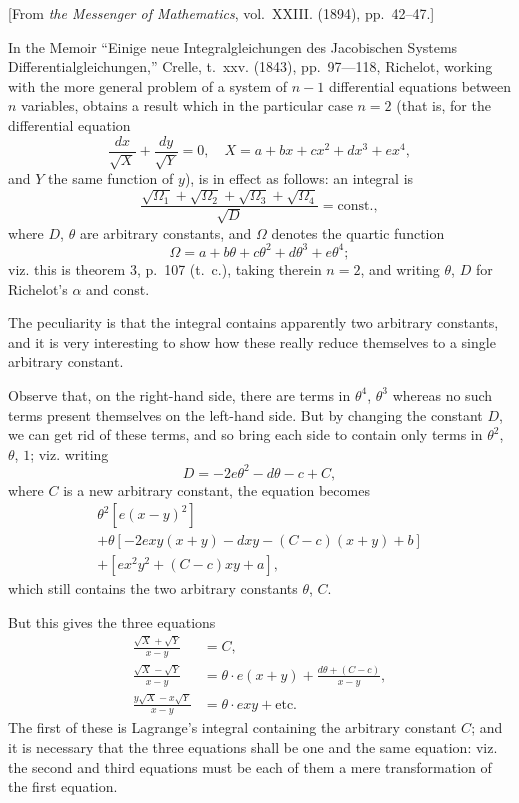 \documentclass[11pt,a4paper]{book}
\begin{document}
[From \textit{the Messenger of Mathematics}, vol.~XXIII. (1894), pp.~42--47.]
\bigskip

In the Memoir ``Einige neue Integralgleichungen des Jacobischen Systems Differentialgleichungen,'' Crelle, t.~xxv. (1843), pp.~97---118, Richelot, working with the more general problem of a system of $n-1$ differential equations between $n$ variables, obtains a result which in the particular case $n=2$ (that is, for the differential equation
\[
\frac{dx}{\sqrt{X}} + \frac{dy}{\sqrt{Y}} = 0, \quad X = a + bx + cx^2 + dx^3 + ex^4,
\]
and $Y$ the same function of $y$), is in effect as follows: an integral is
\[
\frac{\sqrt{\Omega_1}+\sqrt{\Omega_2}+\sqrt{\Omega_3}+\sqrt{\Omega_4}}{\sqrt{D}} = \text{const.},
\]
where $D$, $\theta$ are arbitrary constants, and $\Omega$ denotes the quartic function
\[
\Omega = a + b\theta + c\theta^2 + d\theta^3 + e\theta^4;
\]
viz. this is theorem 3, p.~107 (t.~c.), taking therein $n=2$, and writing $\theta$, $D$ for Richelot's $\alpha$ and const.

The peculiarity is that the integral contains apparently two arbitrary constants, and it is very interesting to show how these really reduce themselves to a single arbitrary constant.

Observe that, on the right-hand side, there are terms in $\theta^4$, $\theta^3$ whereas no such terms present themselves on the left-hand side. But by changing the constant $D$, we can get rid of these terms, and so bring each side to contain only terms in $\theta^2$, $\theta$, $1$; viz. writing
\[
D = -2e\theta^2 - d\theta - c + C,
\]
where $C$ is a new arbitrary constant, the equation becomes
\begin{multline*}
\theta^2\left[e(x-y)^2\right] \\
+ \theta\left[-2exy(x+y) - dxy - (C-c)(x+y) + b\right] \\
+ \left[ex^2y^2 + (C-c)xy + a\right],
\end{multline*}
which still contains the two arbitrary constants $\theta$, $C$.

But this gives the three equations
\begin{align*}
\frac{\sqrt{X}+\sqrt{Y}}{x-y} &= C, \\
\frac{\sqrt{X}-\sqrt{Y}}{x-y} &= \theta\cdot e(x+y) + \frac{d\theta + (C-c)}{x-y}, \\
\frac{y\sqrt{X}-x\sqrt{Y}}{x-y} &= \theta\cdot exy + \text{etc.}
\end{align*}
The first of these is Lagrange's integral containing the arbitrary constant $C$; and it is necessary that the three equations shall be one and the same equation: viz. the second and third equations must be each of them a mere transformation of the first equation.
\end{document}
